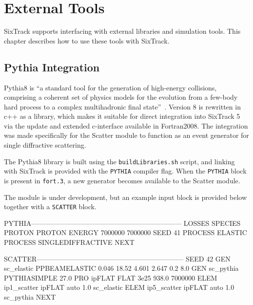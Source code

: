 
\chapter{External Tools} \label{ExtTools}

SixTrack supports interfacing with external libraries and simulation tools.
This chapter describes how to use these tools with SixTrack.

\section{Pythia Integration} \label{ExtPythia}

Pythia8 is ``a standard tool for the generation of high-energy collisions, comprising a coherent set of physics models for the evolution from a few-body hard process to a complex multihadronic final state''~\cite{pythia8}.
Version 8 is rewritten in c++ as a library, which makes it suitable for direct integration into SixTrack 5 via the update and extended c-interface available in Fortran2008.
The integration was made specifically for the Scatter module to function as an event generator for single diffractive scattering.

The Pythia8 library is built using the \texttt{buildLibraries.sh} script, and linking with SixTrack is provided with the \texttt{PYTHIA} compiler flag.
When the \texttt{PYTHIA} block is present in \texttt{fort.3}, a new generator becomes available to the Scatter module.

The module is under development, but an example input block is provided below together with a \texttt{SCATTER} block.

\begin{cverbatim}
PYTHIA------------------------------------------------------------------
  LOSSES
  SPECIES PROTON PROTON
  ENERGY 7000000 7000000
  SEED 41
  PROCESS ELASTIC
  PROCESS SINGLEDIFFRACTIVE
NEXT

SCATTER-----------------------------------------------------------------
  SEED 42
  GEN  sc_elastic  PPBEAMELASTIC 0.046  18.52  4.601  2.647  0.2  8.0
  GEN  sc_pythia   PYTHIASIMPLE  27.0
  PRO  ipFLAT      FLAT   3e25  938.0  7000000
  ELEM ip1_scatter ipFLAT auto 1.0 sc_elastic
  ELEM ip5_scatter ipFLAT auto 1.0 sc_pythia
NEXT
\end{cverbatim}
